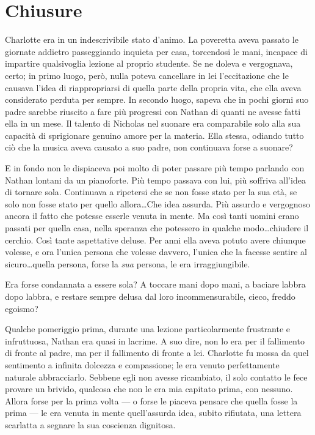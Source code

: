 \chapter{Chiusure}
\label{ch:chiusure}

Charlotte era in un indescrivibile stato d'animo. La poveretta aveva passato le giornate addietro
passeggiando inquieta per casa, torcendosi le mani, incapace di impartire qualsivoglia lezione al
proprio studente. Se ne doleva e vergognava, certo; in primo luogo, però, nulla poteva cancellare in
lei l'eccitazione che le causava l'idea di riappropriarsi di quella parte della propria vita, che
ella aveva considerato perduta per sempre. In secondo luogo, sapeva che in pochi giorni suo padre
sarebbe riuscito a fare più progressi con Nathan di quanti ne avesse fatti ella in un mese. Il
talento di Nicholas nel suonare era comparabile solo alla sua capacità di sprigionare genuino amore
per la materia. Ella stessa, odiando tutto ciò che la musica aveva causato a suo padre, non
continuava forse a suonare?

E in fondo non le dispiaceva poi molto di poter passare più tempo parlando con Nathan lontani da un
pianoforte. Più tempo passava con lui, più soffriva all'idea di tornare sola. Continuava a ripetersi
che se non fosse stato per la sua età, se solo non fosse stato per quello allora\dots Che idea
assurda. Più assurdo e vergognoso ancora il fatto che potesse esserle venuta in mente. Ma così tanti
uomini erano passati per quella casa, nella speranza che potessero in qualche modo\dots chiudere il
cerchio. Così tante aspettative deluse. Per anni ella aveva potuto avere chiunque volesse, e ora
l'unica persona che volesse davvero, l'unica che la facesse sentire al sicuro\dots quella persona,
forse la \emph{sua} persona, le era irraggiungibile.

Era forse condannata a essere sola? A toccare mani dopo mani, a baciare labbra dopo labbra, e
restare sempre delusa dal loro incommensurabile, cieco, freddo egoismo?

Qualche pomeriggio prima, durante una lezione particolarmente frustrante e infruttuosa, Nathan era
quasi in lacrime. A suo dire, non lo era per il fallimento di fronte al padre, ma per il fallimento
di fronte a lei. Charlotte fu mossa da quel sentimento a infinita dolcezza e compassione; le era
venuto perfettamente naturale abbracciarlo. Sebbene egli non avesse ricambiato, il solo contatto le
fece provare un brivido, qualcosa che non le era mia capitato prima, con nessuno. Allora forse per
la prima volta — o forse le piaceva pensare che quella fosse la prima — le era venuta in mente
quell'assurda idea, subito rifiutata, una lettera scarlatta a segnare la sua coscienza dignitosa.

